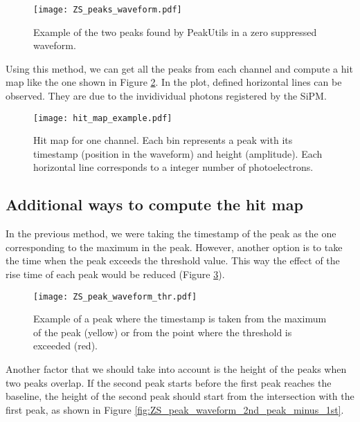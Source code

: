 \documentclass[11pt,a4paper,english,oneside, pdf]{article}
\begin{document}
	\begin{figure}[!h]
		\begin{center}
			\texttt{[image: ZS\_peaks\_waveform.pdf]}
			\caption{Example of the two peaks found by PeakUtils in a zero suppressed waveform.}
			\label{fig:ZS_peaks_waveform}
		\end{center}
	\end{figure}
	
	Using this method, we can get all the peaks from each channel and compute a hit map like the one shown in Figure \ref{fig:hit_map_example}. In the plot, defined horizontal lines can be observed. They are due to the invidividual photons registered by the SiPM.
	
	\begin{figure}[!h]
		\begin{center}
			\texttt{[image: hit\_map\_example.pdf]}
			\caption{Hit map for one channel. Each bin represents a peak with its timestamp (position in the waveform) and height (amplitude). Each horizontal line corresponds to a integer number of photoelectrons.}
			\label{fig:hit_map_example}
		\end{center}
	\end{figure}
	
	
	
	
	\subsection*{Additional ways to compute the hit map}
	
	In the previous method, we were taking the timestamp of the peak as the one corresponding to the maximum in the peak. However, another option is to take the time when the peak exceeds the threshold value. This way the effect of the rise time of each peak would be reduced (Figure \ref{fig:ZS_peak_waveform_thr}).
	
	\begin{figure}[!h]
		\begin{center}
			\texttt{[image: ZS\_peak\_waveform\_thr.pdf]}
			\caption{Example of a peak where the timestamp is taken from the maximum of the peak (yellow) or from the point where the threshold is exceeded (red).}
			\label{fig:ZS_peak_waveform_thr}
		\end{center}
	\end{figure}
	
	Another factor that we should take into account is the height of the peaks when two peaks overlap. If the second peak starts before the first peak reaches the baseline, the height of the second peak should start from the intersection with the first peak, as shown in Figure \ref{fig:ZS_peak_waveform_2nd_peak_minus_1st}.
	
\end{document}
